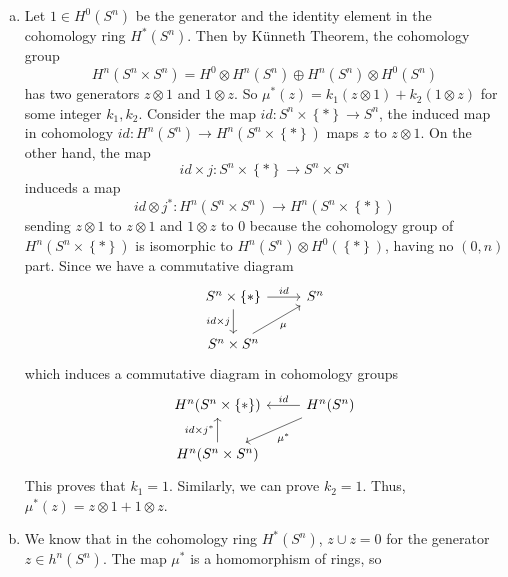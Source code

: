 \documentclass[letterpaper, 12pt]{article}
\begin{document}
\begin{solution}
\begin{enumerate}[(a)]
\item Let \(1\in H^0(S^n)\) be the generator and the identity element in the cohomology ring \(H^*(S^n)\). Then by Künneth Theorem, the cohomology group 
\[H^n(S^n\times S^n)=H^0\otimes H^n(S^n)\oplus H^n(S^n)\otimes H^0(S^n)\]
has two generators \(z\otimes 1\) and \(1\otimes z\). So \(\mu^*(z)=k_1(z\otimes 1)+k_2(1\otimes z)\) for some integer \(k_1,k_2\). Consider the map \(id:S^n\times \left\{ * \right\}\rightarrow S^n\), the induced map in cohomology \(id:H^n(S^n)\rightarrow H^n(S^n\times \left\{ * \right\})\) maps \(z\) to \(z\otimes 1\). On the other hand, the map 
\[id\times j:S^n\times \left\{ * \right\}\rightarrow S^n\times S^n\]
induceds a map 
\[id\otimes j^*:H^n(S^n\times S^n)\rightarrow H^n(S^n\times \left\{ * \right\})\]
sending \(z\otimes 1\) to \(z\otimes 1\) and \(1\otimes z\) to \(0\) because the cohomology group of \(H^n(S^n\times \left\{ * \right\})\) is isomorphic to \(H^n(S^n)\otimes H^0(\left\{ * \right\})\), having no \((0,n)\) part.  Since we have a commutative diagram 
\[\begin{tikzcd}
	{S^n\times \left\{*\right\}} & {S^n} \\
	{S^n\times S^n}
	\arrow["id", from=1-1, to=1-2]
	\arrow["{id\times j}"', from=1-1, to=2-1]
	\arrow["\mu"', from=2-1, to=1-2]
\end{tikzcd}\]
which induces a commutative diagram in cohomology groups 
\[\begin{tikzcd}
	{H^n(S^n\times \left\{*\right\})} & {H^n(S^n)} \\
	{H^n(S^n\times S^n)}
	\arrow["id"', from=1-2, to=1-1]
	\arrow["{\mu^*}", from=1-2, to=2-1]
	\arrow["{id\times j^*}", from=2-1, to=1-1]
\end{tikzcd}\]
This proves that \(k_1=1\). Similarly, we can prove \(k_2=1\). Thus, \(\mu^*(z)=z\otimes 1+1\otimes z\). 
\item We know that in the cohomology ring \(H^*(S^n)\), \(z\cup z=0\) for the generator \(z\in h^n(S^n)\). The map \(\mu^*\) is a homomorphism of rings, so 

\end{enumerate}
\end{solution}
\end{document}

